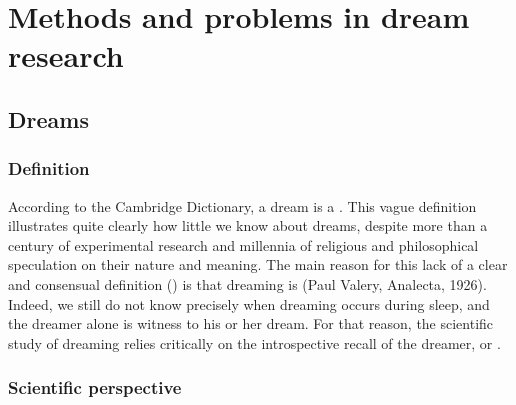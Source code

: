 %
\chapter{Methods and problems in dream research}
\label{sec:dream-research}


\section{Dreams}
\label{sec:dream-research:dreams}

\subsection{Definition}
\label{sec:dream-research:dreams:definition}

According to the Cambridge Dictionary, a dream is a . This vague definition illustrates quite clearly how little we know about dreams, despite more than a century of experimental research and millennia of religious and philosophical speculation on their nature and meaning. The main reason for this lack of a clear and consensual definition (\cite{pagel_definitions_2001}) is that dreaming is  (Paul Valery, Analecta, 1926).  Indeed, we still do not know precisely when dreaming occurs during sleep, and the dreamer alone is witness to his or her dream. For that reason, the scientific study of dreaming relies critically on the introspective recall of the dreamer, or  \citep{schwartz_dreaming:_2005}.

\subsection{Scientific perspective}
\label{sec:dream-research:dreams:science}

